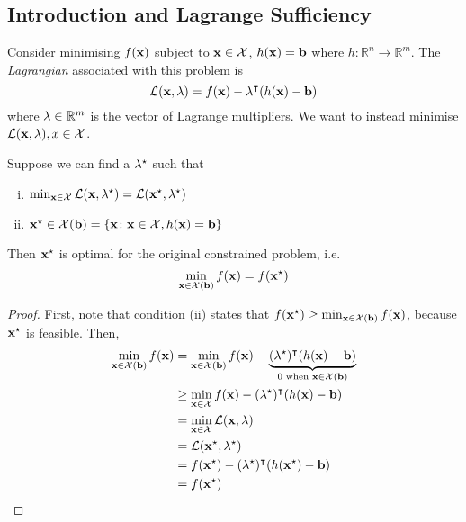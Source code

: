 \subsection{Introduction and Lagrange Sufficiency}
Consider minimising \(f(\vb x)\) subject to \(\vb x \in \mathcal X\), \(h(\vb x) = \vb b\) where \(h \colon \mathbb R^n \to \mathbb R^m\).
The \textit{Lagrangian} associated with this problem is
\[
    \mathcal L(\vb x, \vb \lambda) = f(\vb x) - \vb \lambda^\intercal(h(\vb x) - \vb b)
\]
where \(\vb\lambda \in \mathbb R^m\) is the vector of Lagrange multipliers.
We want to instead minimise \(\mathcal L(\vb x, \vb \lambda), x \in \mathcal X\).
\begin{theorem}
    Suppose we can find a \(\vb \lambda^\star\) such that
    \begin{enumerate}[(i)]
        \item \(\min_{\vb x \in \mathcal X} \mathcal L(\vb x, \vb \lambda^\star) = \mathcal L(\vb x^\star, \vb\lambda^\star)\)
        \item \(\vb x^\star \in \mathcal X(\vb b) = \qty{\vb x \colon \vb x \in \mathcal X, h(\vb x) = \vb b}\)
    \end{enumerate}
    Then \(\vb x^\star\) is optimal for the original constrained problem, i.e.
    \[ \min_{\vb x \in \mathcal X(\vb b)} f(\vb x) = f(\vb x^\star) \]
\end{theorem}
\begin{proof}
    First, note that condition (ii) states that \(f(\vb x^\star) \geq \min_{\vb x \in \mathcal X(\vb b)}f(\vb x)\), because \(\vb x^\star\) is feasible.
    Then,
    \begin{align*}
        \min_{\vb x \in \mathcal X(\vb b)}f(\vb x) &= \min_{\vb x \in \mathcal X(\vb b)} f(\vb x) - \underbrace{(\vb\lambda^\star)^\intercal (h(\vb x) - \vb b)}_{0 \text{ when } \vb x \in \mathcal X(\vb b)} \\
        &\geq \min_{\vb x \in \mathcal X} f(\vb x) - (\vb\lambda^\star)^\intercal (h(\vb x) - \vb b) \\
        &= \min_{\vb x \in \mathcal X} \mathcal L(\vb x, \vb \lambda) \\
        &= \mathcal L(\vb x^\star, \vb \lambda^\star) \\
        &= f(\vb x^\star) - (\vb\lambda^\star)^\intercal (h(\vb x^\star) - \vb b) \\
        &= f(\vb x^\star)
    \end{align*}
\end{proof}

